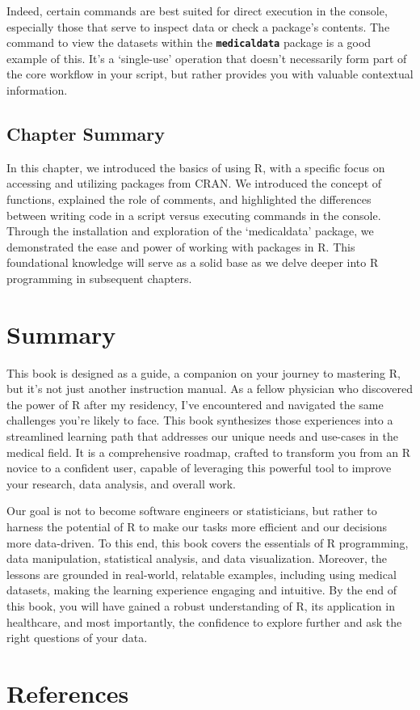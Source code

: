 \documentclass[
  letterpaper,
  DIV=11,
  numbers=noendperiod]{scrreprt}
\newlength{\cslhangindent}
\newlength{\cslentryspacingunit} %
\newenvironment{CSLReferences}[2] %
 {%
  \setlength{\parindent}{0pt}
  \ifodd #1
  \let\oldpar\par
  \def\par{\hangindent=\cslhangindent\oldpar}
  \fi
  \setlength{\parskip}{#2\cslentryspacingunit}
 }%
 {}
\begin{document}
Indeed, certain commands are best suited for direct execution in the
console, especially those that serve to inspect data or check a
package's contents. The command to view the datasets within the
\textbf{\texttt{medicaldata}} package is a good example of this. It's a
`single-use' operation that doesn't necessarily form part of the core
workflow in your script, but rather provides you with valuable
contextual information.

\hypertarget{chapter-summary}{%
\section{Chapter Summary}\label{chapter-summary}}

In this chapter, we introduced the basics of using R, with a specific
focus on accessing and utilizing packages from CRAN. We introduced the
concept of functions, explained the role of comments, and highlighted
the differences between writing code in a script versus executing
commands in the console. Through the installation and exploration of the
`medicaldata' package, we demonstrated the ease and power of working
with packages in R. This foundational knowledge will serve as a solid
base as we delve deeper into R programming in subsequent chapters.


\hypertarget{summary}{%
\chapter{Summary}\label{summary}}

This book is designed as a guide, a companion on your journey to
mastering R, but it's not just another instruction manual. As a fellow
physician who discovered the power of R after my residency, I've
encountered and navigated the same challenges you're likely to face.
This book synthesizes those experiences into a streamlined learning path
that addresses our unique needs and use-cases in the medical field. It
is a comprehensive roadmap, crafted to transform you from an R novice to
a confident user, capable of leveraging this powerful tool to improve
your research, data analysis, and overall work.

Our goal is not to become software engineers or statisticians, but
rather to harness the potential of R to make our tasks more efficient
and our decisions more data-driven. To this end, this book covers the
essentials of R programming, data manipulation, statistical analysis,
and data visualization. Moreover, the lessons are grounded in
real-world, relatable examples, including using medical datasets, making
the learning experience engaging and intuitive. By the end of this book,
you will have gained a robust understanding of R, its application in
healthcare, and most importantly, the confidence to explore further and
ask the right questions of your data.


\hypertarget{references}{%
\chapter*{References}\label{references}}


\hypertarget{refs}{}
\begin{CSLReferences}{0}{0}
\end{CSLReferences}
\end{document}
